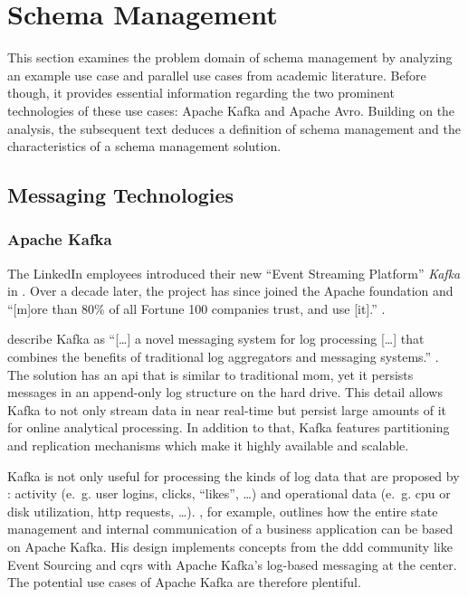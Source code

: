 
\section{Schema Management}\label{sec:schema-management}

This section examines the problem domain of schema management by analyzing an example use case and parallel use cases from academic literature.
Before though, it provides essential information regarding the two prominent technologies of these use cases: Apache Kafka and Apache Avro.
Building on the analysis, the subsequent text deduces a definition of schema management and the characteristics of a schema management solution.

\subsection{Messaging Technologies}

\subsubsection{Apache Kafka}

The LinkedIn employees \citeauthor{kreps_kafka_2011} introduced their new \enquote{Event Streaming Platform} \emph{Kafka} in \citeyear{kreps_kafka_2011}. \parencite{kreps_kafka_2011}
Over a decade later, the project has since joined the Apache foundation and \enquote{[m]ore than 80\% of all Fortune 100 companies trust, and use [it].} \parencite{apache_software_foundation_apache_nodate}.

\citeauthor{kreps_kafka_2011} describe Kafka as \enquote{[\ldots] a novel messaging system for log processing [\ldots] that combines the benefits of traditional log aggregators and messaging systems.} \parencite{kreps_kafka_2011}.
The solution has an \gls{api} that is similar to traditional \gls{mom}, yet it persists messages in an append-only log structure on the hard drive.
This detail allows Kafka to not only stream data in near real-time but persist large amounts of it for online analytical processing.
In addition to that, Kafka features partitioning and replication mechanisms which make it highly available and scalable. \parencite{kreps_kafka_2011}

Kafka is not only useful for processing the kinds of log data that are proposed by \citeauthor{kreps_kafka_2011}: activity (e.~g. user logins, clicks, \enquote{likes}, \ldots) and operational data (e.~g. \gls{cpu} or disk utilization, \gls{http} requests, \ldots). \parencite{kreps_kafka_2011}
\citeauthor{stopford_designing_2018}, for example, outlines how the entire state management and internal communication of a business application can be based on Apache Kafka.
His design implements concepts from the \gls{ddd} community like Event Sourcing \parencite{fowler_event_sourcing_2005} and \gls{cqrs} \parencite{fowler_cqrs_2011} with Apache Kafka's log-based messaging at the center. \parencite{stopford_designing_2018}
The potential use cases of Apache Kafka are therefore plentiful.


